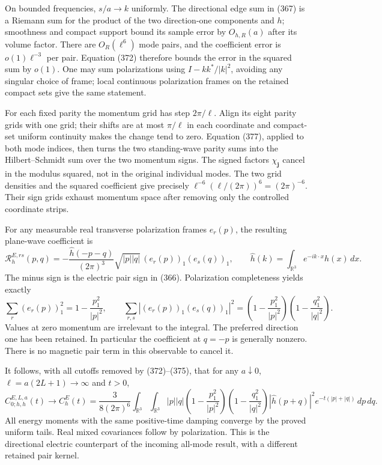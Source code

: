\documentclass[
  11pt,
]{article}
\begin{document}
On bounded frequencies, \(s/a\to k\) uniformly. The directional edge sum
in (367) is a Riemann sum for the product of the two direction-one
components and \(h\); smoothness and compact support bound its sample
error by \(O_{h,R}(a)\) after its volume factor. There are
\(O_R(\ell^6)\) mode pairs, and the coefficient error is
\(o(1)\ell^{-3}\) per pair. Equation (372) therefore bounds the error in
the squared sum by \(o(1)\). One may sum polarizations using
\(I-kk^*/|k|^2\), avoiding any singular choice of frame; local
continuous polarization frames on the retained compact sets give the
same statement.

For each fixed parity the momentum grid has step \(2\pi/\ell\). Align
its eight parity grids with one grid; their shifts are at most
\(\pi/\ell\) in each coordinate and compact-set uniform continuity makes
the change tend to zero. Equation (377), applied to both mode indices,
then turns the two standing-wave parity sums into the Hilbert--Schmidt
sum over the two momentum signs. The signed factors
\(\chi_{\boldsymbol j}\) cancel in the modulus squared, not in the
original individual modes. The two grid densities and the squared
coefficient give precisely \(\ell^{-6}(\ell/(2\pi))^6=(2\pi)^{-6}\).
Their sign grids exhaust momentum space after removing only the
controlled coordinate strips.

For any measurable real transverse polarization frames \(e_r(p)\), the
resulting plane-wave coefficient is \[
 \boxed{
 \mathcal R^{E,rs}_h(p,q)
 =-\frac{\widehat h(-p-q)}{(2\pi)^3}
       \sqrt{|p||q|}\,(e_r(p))_1(e_s(q))_1,\qquad
 \widehat h(k)=\int_{\mathbb R^3}e^{-ik\cdot x}h(x)\,dx .
 }
 \tag{378}
\] The minus sign is the electric pair sign in (366). Polarization
completeness yields exactly \[
 \sum_r(e_r(p))_1^2=1-\frac{p_1^2}{|p|^2},\qquad
 \sum_{r,s}|(e_r(p))_1(e_s(q))_1|^2
 =\left(1-\frac{p_1^2}{|p|^2}\right)
  \left(1-\frac{q_1^2}{|q|^2}\right).
 \tag{379}
\] Values at zero momentum are irrelevant to the integral. The preferred
direction one has been retained. In particular the coefficient at
\(q=-p\) is generally nonzero. There is no magnetic pair term in this
observable to cancel it.

It follows, with all cutoffs removed by (372)--(375), that for any
\(a\downarrow0\), \(\ell=a(2L+1)\to\infty\) and \(t>0\), \[
 \boxed{
 C^{E,L,a}_{0;h,h}(t)\longrightarrow C^E_h(t)
 =\frac{3}{8(2\pi)^6}
 \int_{\mathbb R^3}\!\int_{\mathbb R^3}
 |p||q|\left(1-\frac{p_1^2}{|p|^2}\right)
       \left(1-\frac{q_1^2}{|q|^2}\right)
 |\widehat h(p+q)|^2e^{-t(|p|+|q|)}\,dp\,dq .
 }
 \tag{380}
\] All energy moments with the same positive-time damping converge by
the proved uniform tails. Real mixed covariances follow by polarization.
This is the directional electric counterpart of the incoming all-mode
result, with a different retained pair kernel.
\end{document}
